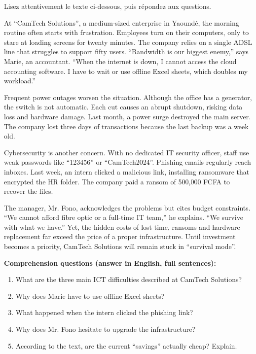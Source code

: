 \documentclass[11pt]{article}
\begin{document}
\begin{exercice}
Lisez attentivement le texte ci-dessous, puis répondez aux questions.
\begin{textebox}
At “CamTech Solutions”, a medium-sized enterprise in Yaoundé, the morning routine often starts with frustration. Employees turn on their computers, only to stare at loading screens for twenty minutes. The company relies on a single ADSL line that struggles to support fifty users. “Bandwidth is our biggest enemy,” says Marie, an accountant. “When the internet is down, I cannot access the cloud accounting software. I have to wait or use offline Excel sheets, which doubles my workload.”

Frequent power outages worsen the situation. Although the office has a generator, the switch is not automatic. Each cut causes an abrupt shutdown, risking data loss and hardware damage. Last month, a power surge destroyed the main server. The company lost three days of transactions because the last backup was a week old.

Cybersecurity is another concern. With no dedicated IT security officer, staff use weak passwords like “123456” or “CamTech2024”. Phishing emails regularly reach inboxes. Last week, an intern clicked a malicious link, installing ransomware that encrypted the HR folder. The company paid a ransom of 500,000 FCFA to recover the files.

The manager, Mr. Fono, acknowledges the problems but cites budget constraints. “We cannot afford fibre optic or a full-time IT team,” he explains. “We survive with what we have.” Yet, the hidden costs of lost time, ransoms and hardware replacement far exceed the price of a proper infrastructure. Until investment becomes a priority, CamTech Solutions will remain stuck in “survival mode”.
\end{textebox}

\textbf{Comprehension questions (answer in English, full sentences):}
\begin{enumerate}
    \item What are the three main ICT difficulties described at CamTech Solutions?
    \item Why does Marie have to use offline Excel sheets?
    \item What happened when the intern clicked the phishing link?
    \item Why does Mr. Fono hesitate to upgrade the infrastructure?
    \item According to the text, are the current “savings” actually cheap? Explain.
\end{enumerate}


\end{exercice}
\end{document}
